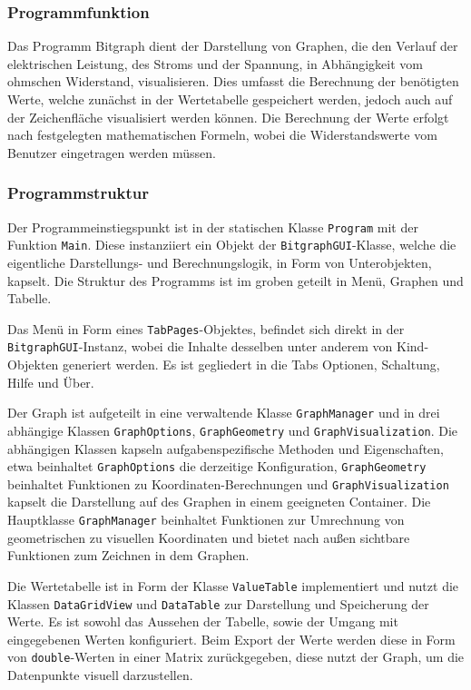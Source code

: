 \documentclass[a4paper]{article}
\begin{document}
    \subsubsection{Programmfunktion}
    Das Programm \glqq Bitgraph\grqq{} dient der Darstellung von Graphen, die den Verlauf der elektrischen Leistung, des Stroms und der Spannung, in Abhängigkeit vom ohmschen Widerstand, visualisieren.
    Dies umfasst die Berechnung der benötigten Werte, welche zunächst in der Wertetabelle gespeichert werden, jedoch auch auf der Zeichenfläche visualisiert werden können.
    Die Berechnung der Werte erfolgt nach festgelegten mathematischen Formeln, wobei die Widerstandswerte vom Benutzer eingetragen werden müssen.

    \subsubsection{Programmstruktur}
    
    Der Programmeinstiegspunkt ist in der statischen Klasse \verb|Program| mit der Funktion \verb|Main|.
    Diese instanziiert ein Objekt der \verb|BitgraphGUI|-Klasse, welche die eigentliche Darstellungs- und Berechnungslogik, in Form von Unterobjekten, kapselt.
    Die Struktur des Programms ist im groben geteilt in Menü, Graphen und Tabelle.

    Das Menü in Form eines \verb|TabPages|-Objektes, befindet sich direkt in der \verb|BitgraphGUI|-Instanz, wobei die Inhalte desselben unter anderem von Kind-Objekten generiert werden.
    Es ist gegliedert in die Tabs \glqq Optionen\grqq{}, \glqq Schaltung\grqq{}, \glqq Hilfe\grqq{} und \glqq Über\grqq{}.
    
    Der Graph ist aufgeteilt in eine verwaltende Klasse \verb|GraphManager| und in drei abhängige Klassen \verb|GraphOptions|, \verb|GraphGeometry| und \verb|GraphVisualization|.
    Die abhängigen Klassen kapseln aufgabenspezifische Methoden und Eigenschaften, etwa beinhaltet \verb|GraphOptions| die derzeitige Konfiguration, \verb|GraphGeometry| beinhaltet Funktionen zu Koordinaten-Berechnungen und \verb|GraphVisualization| kapselt die Darstellung auf des Graphen in einem geeigneten Container.
    Die Hauptklasse \verb|GraphManager| beinhaltet Funktionen zur Umrechnung von geometrischen zu visuellen Koordinaten und bietet nach außen sichtbare Funktionen zum Zeichnen in dem Graphen.
    
    Die Wertetabelle ist in Form der Klasse \verb|ValueTable| implementiert und nutzt die Klassen \verb|DataGridView| und \verb|DataTable| zur Darstellung und Speicherung der Werte.
    Es ist sowohl das Aussehen der Tabelle, sowie der Umgang mit eingegebenen Werten konfiguriert.
    Beim Export der Werte werden diese in Form von \verb|double|-Werten in einer Matrix zurückgegeben, diese nutzt der Graph, um die Datenpunkte visuell darzustellen.
\end{document}
